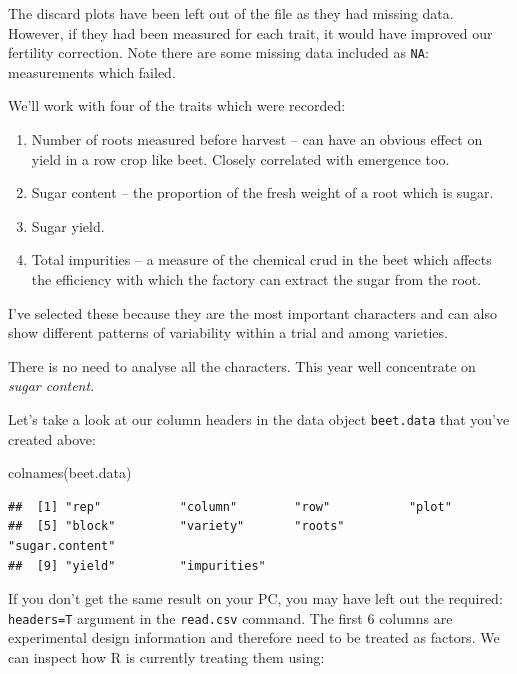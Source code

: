 \documentclass[
]{book}
\newenvironment{Shaded}{\begin{snugshade}}{\end{snugshade}}
\newcommand{\FunctionTok}[1]{\textcolor[rgb]{0.00,0.00,0.00}{#1}}
\newcommand{\NormalTok}[1]{#1}
\begin{document}
The discard plots have been left out of the file as they had missing data. However, if they had been measured for each trait, it would have improved our fertility correction. Note there are some missing data included as \texttt{NA}: measurements which failed.

We'll work with four of the traits which were recorded:

\begin{enumerate}
\def\labelenumi{\arabic{enumi}.}
\item
  Number of roots measured before harvest -- can have an obvious effect on yield in a row crop like beet. Closely correlated with emergence too.
\item
  Sugar content -- the proportion of the fresh weight of a root which is sugar.
\item
  Sugar yield.
\item
  Total impurities -- a measure of the chemical crud in the beet which affects the efficiency with which the factory can extract the sugar from the root.
\end{enumerate}

I've selected these because they are the most important characters and can also show different patterns of variability within a trial and among varieties.

There is no need to analyse all the characters. This year well concentrate on \emph{sugar content}.

Let's take a look at our column headers in the data object \texttt{beet.data} that you've created above:

\begin{Shaded}
\begin{Highlighting}[]
\FunctionTok{colnames}\NormalTok{(beet.data)}
\end{Highlighting}
\end{Shaded}

\begin{verbatim}
##  [1] "rep"           "column"        "row"           "plot"         
##  [5] "block"         "variety"       "roots"         "sugar.content"
##  [9] "yield"         "impurities"
\end{verbatim}

If you don't get the same result on your PC, you may have left out the required: \texttt{headers=T} argument in the \texttt{read.csv} command. The first 6 columns are experimental design information and therefore need to be treated as factors. We can inspect how R is currently treating them using:
\end{document}
